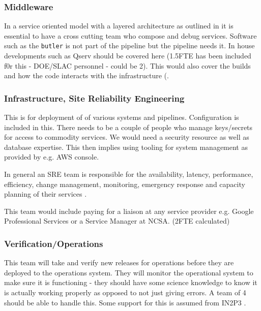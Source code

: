 \subsubsection{Middleware }
In a service oriented model with a layered architecture as outlined in  it is essential to have a cross cutting team who compose and debug services.
Software such as the \texttt{butler}  is not part of the pipeline but the pipeline needs it. In house developments such as \gls{Qserv} should be covered here (1.5FTE has been included f0r this - DOE/SLAC personnel - could be 2).
This would also cover the builds and how the code interacts with the infrastructure (.

\subsubsection{Infrastructure, Site Reliability Engineering  } \label{ses:infra}
This is for deployment of of various systems and pipelines. Configuration is included in this. There needs to be a couple of people who manage keys/secrets
for access to commodity services. We would need a security resource as well as database expertise.  This then implies using tooling for system management as
provided by e.g. \gls{AWS} console.

In general an \gls{SRE} team is responsible for the availability, latency, performance, efficiency, change management, monitoring, emergency response and capacity planning of their services \cite{Beyer:2016:SRE:3006357}.

This team would include paying for a liaison at any service provider e.g. Google Professional Services or a Service Manager at \gls{NCSA}. (2FTE calculated)

\subsubsection{Verification/Operations }
This team will take and verify new releases for operations before they are deployed to the operations system. They will monitor the operational system to make sure it is functioning - they should have some science knowledge to know it is actually working properly as opposed to not just giving errors. A team of 4 should be able to handle this.
Some support for this is assumed from IN2P3 .
